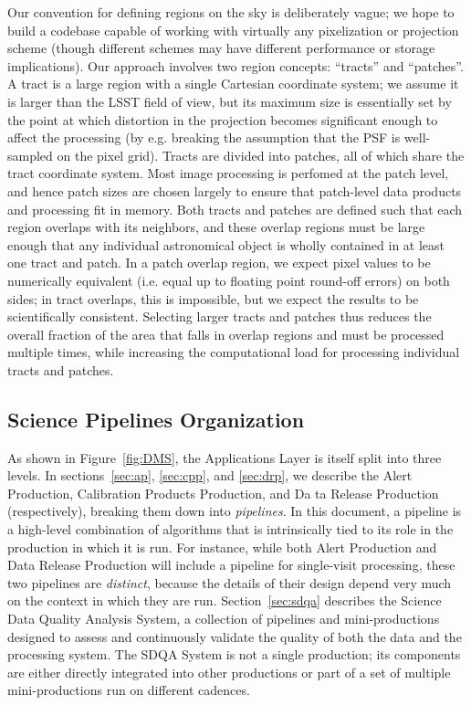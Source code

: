 Our convention for defining regions on the sky is deliberately vague; we hope to build a codebase capable of working with virtually any pixelization or projection scheme (though different schemes may have different performance or storage implications).  Our approach involves two region concepts: ``tracts'' and ``patches''.  A tract is a large region with a single Cartesian coordinate system; we assume it is larger than the LSST field of view, but its maximum size is essentially set by the point at which distortion in the projection becomes significant enough to affect the processing (by e.g. breaking the assumption that the PSF is well-sampled on the pixel grid).  Tracts are divided into patches, all of which share the tract coordinate system.  Most image processing is perfomed at the patch level, and hence patch sizes are chosen largely to ensure that patch-level data products and processing fit in memory.  Both tracts and patches are defined such that each region overlaps with its neighbors, and these overlap regions must be large enough that any individual astronomical object is wholly contained in at least one tract and patch.  In a patch overlap region, we expect pixel values to be numerically equivalent (i.e. equal up to floating point round-off errors) on both sides; in tract overlaps, this is impossible, but we expect the results to be scientifically consistent.  Selecting larger tracts and patches thus reduces the overall fraction of the area that falls in overlap regions and must be processed multiple times, while increasing the computational load for processing individual tracts and patches.

\subsection{Science Pipelines Organization}

As shown in Figure~\ref{fig:DMS}, the Applications Layer is itself split into three levels.  In sections~\ref{sec:ap}, \ref{sec:cpp}, and \ref{sec:drp}, we describe the Alert Production, Calibration Products Production, and Da
ta Release Production (respectively), breaking them down into \emph{pipelines}.  In this document, a pipeline is a high-level combination of algorithms that is intrinsically tied to its role in the production in which it is run.  For instance, while both Alert Production and Data Release Production will include a pipeline for single-visit processing, these two pipelines are \emph{distinct}, because the details of their design depend very much on the context in which they are run.  Section~\ref{sec:sdqa} describes the Science Data Quality Analysis System, a collection of pipelines and mini-productions designed to assess and continuously validate the quality of both the data and the processing system.  The SDQA System is not a single production; its components are either directly integrated into other productions or part of a set of multiple mini-productions run on different cadences.

